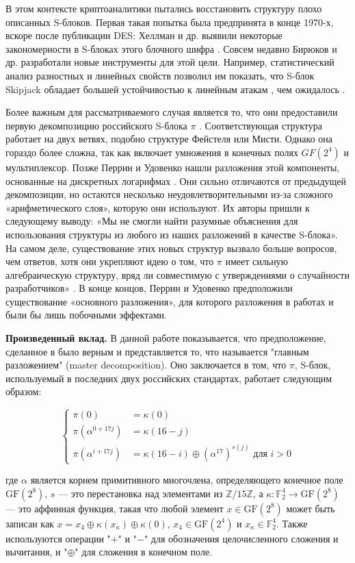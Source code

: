 В этом контексте криптоаналитики пытались восстановить структуру плохо описанных S-блоков. Первая такая попытка была предпринята в конце 1970-х, вскоре после публикации DES: Хеллман и др. выявили некоторые закономерности в S-блоках этого блочного шифра \cite{HMS76}. Совсем недавно Бирюков и др. разработали новые инструменты для этой цели. Например, статистический анализ разностных и линейных свойств позволил им показать, что S-блок Skipjack обладает большей устойчивостью к линейным атакам \cite{Mat94}, чем ожидалось \cite{BP15}.

Более важным для рассматриваемого случая является то, что они предоставили первую декомпозицию российского S-блока \(\pi\) \cite{BPU16a, BPU16b}. Соответствующая структура работает на двух ветвях, подобно структуре Фейстеля или Мисти. Однако она гораздо более сложна, так как включает умножения в конечных полях \(GF(2^4)\) и мультиплексор. Позже Перрин и Удовенко нашли разложения этой компоненты, основанные на дискретных логарифмах \cite{PU16}. Они сильно отличаются от предыдущей декомпозиции, но остаются несколько неудовлетворительными из-за сложного «арифметического слоя», которую они используют. Их авторы пришли к следующему выводу: «Мы не смогли найти разумные объяснения для использования структуры из любого из наших разложений в качестве S-блока». На самом деле, существование этих новых структур вызвало больше вопросов, чем ответов, хотя они укрепляют идею о том, что \(\pi\) имеет сильную алгебраическую структуру, вряд ли совместимую с утверждениями о случайности разработчиков» \cite{PU16}. В конце концов, Перрин и Удовенко предположили существование «основного разложения», для которого разложения в работах \cite{BPU16a} и \cite{PU16} были бы лишь побочными эффектами.

\textbf{Произведенный вклад.} В данной работе показывается, что предположение, сделанное в \cite{PU16} было верным и представляется то, что называется "главным разложением" (master decomposition). Оно заключается в том, что \(\pi\), S-блок, используемый в последних двух российских стандартах, работает следующим образом:

$$
\begin{cases}\pi(0) & =\kappa(0) \\ \pi\left(\alpha^{0+17 j}\right) & =\kappa(16-j) \\ \pi\left(\alpha^{i+17 j}\right) & =\kappa(16-i) \oplus\left(\alpha^{17}\right)^{s(j)} \text { для } i>0\end{cases}
$$

где \(\alpha\) является корнем примитивного многочлена, определяющего конечное поле \(\text{GF}(2^8)\), \(s\) — это перестановка над элементами из \( \mathbb{Z}/15\mathbb{Z} \), а \(\kappa: \mathbb{F}_2^4 \to \text{GF}(2^8)\) — это аффинная функция, такая что любой элемент \(x \in \text{GF}(2^8)\) может быть записан как \(x = x_4 \oplus \kappa(x_\kappa) \oplus \kappa(0)\), \(x_4 \in \text{GF}(2^4)\) и \(x_\kappa \in \mathbb{F}_2^4\). Также используются операции "$+$" и "$-$" для обозначения целочисленного сложения и вычитания, и "$\oplus$" для сложения в конечном поле.


